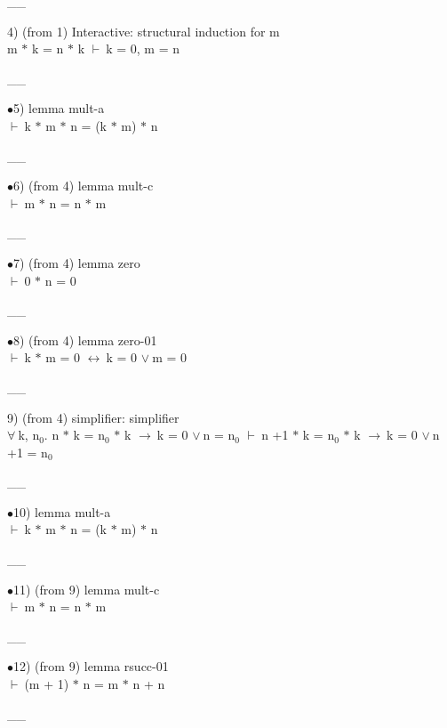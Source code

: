 \documentclass[a4paper]{article}
\newcommand{\Fol}{\mbox{$\vdash\ $}}
\newcommand{\Or}{\mbox{$\vee\ $}}
\newcommand{\Imp}{\mbox{$\rightarrow\ $}}
\newcommand{\Equiv}{\mbox{$\leftrightarrow\ $}}
\newcommand{\All}{\mbox{$\forall\ $}}
\begin{document}
\vspace{-1.5ex}\_\hrulefill \_

4)  (from 1) Interactive: structural induction  for m\\
m $*$ k = n $*$ k \Fol k = 0, m = n

\vspace{-1.5ex}\_\hrulefill \_

$\bullet$5) lemma mult-a \\
 \Fol k $*$ m $*$ n = (k $*$ m) $*$ n

\vspace{-1.5ex}\_\hrulefill \_

$\bullet$6)  (from 4) lemma mult-c \\
 \Fol m $*$ n = n $*$ m

\vspace{-1.5ex}\_\hrulefill \_

$\bullet$7)  (from 4) lemma zero \\
 \Fol 0 $*$ n = 0

\vspace{-1.5ex}\_\hrulefill \_

$\bullet$8)  (from 4) lemma zero-01 \\
 \Fol k $*$ m = 0 \Equiv k = 0 \Or m = 0

\vspace{-1.5ex}\_\hrulefill \_

9)  (from 4) simplifier: simplifier \\
\All k, $\mbox{n}_{0}$. n $*$ k = $\mbox{n}_{0}$ $*$ k \Imp k = 0 \Or n = $\mbox{n}_{0}$ \Fol n +1 $*$ k = $\mbox{n}_{0}$ $*$ k \Imp k = 0 \Or n +1 = $\mbox{n}_{0}$

\vspace{-1.5ex}\_\hrulefill \_

$\bullet$10) lemma mult-a \\
 \Fol k $*$ m $*$ n = (k $*$ m) $*$ n

\vspace{-1.5ex}\_\hrulefill \_

$\bullet$11)  (from 9) lemma mult-c \\
 \Fol m $*$ n = n $*$ m

\vspace{-1.5ex}\_\hrulefill \_

$\bullet$12)  (from 9) lemma rsucc-01 \\
 \Fol (m + 1) $*$ n = m $*$ n + n

\vspace{-1.5ex}\_\hrulefill \_
\end{document}
